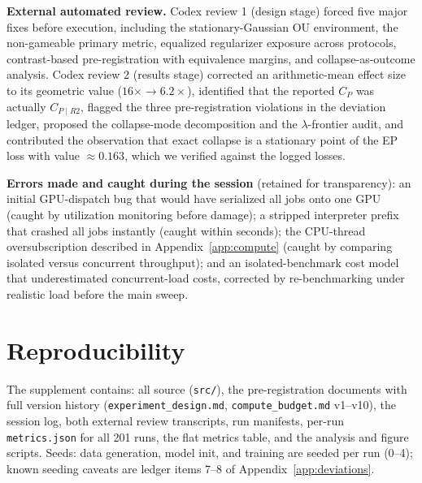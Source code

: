 \textbf{External automated review.} Codex review 1 (design stage) forced five major fixes before execution, including the stationary-Gaussian OU environment, the non-gameable primary metric, equalized regularizer exposure across protocols, contrast-based pre-registration with equivalence margins, and collapse-as-outcome analysis. Codex review 2 (results stage) corrected an arithmetic-mean effect size to its geometric value ($16\times\to6.2\times$), identified that the reported $C_P$ was actually $C_{P\mid R2}$, flagged the three pre-registration violations in the deviation ledger, proposed the collapse-mode decomposition and the $\lambda$-frontier audit, and contributed the observation that exact collapse is a stationary point of the EP loss with value $\approx0.163$, which we verified against the logged losses.

\textbf{Errors made and caught during the session} (retained for transparency): an initial GPU-dispatch bug that would have serialized all jobs onto one GPU (caught by utilization monitoring before damage); a stripped interpreter prefix that crashed all jobs instantly (caught within seconds); the CPU-thread oversubscription described in Appendix~\ref{app:compute} (caught by comparing isolated versus concurrent throughput); and an isolated-benchmark cost model that underestimated concurrent-load costs, corrected by re-benchmarking under realistic load before the main sweep.

\section{Reproducibility}
\label{app:repro}

The supplement contains: all source (\texttt{src/}), the pre-registration documents with full version history (\texttt{experiment\_design.md}, \texttt{compute\_budget.md} v1--v10), the session log, both external review transcripts, run manifests, per-run \texttt{metrics.json} for all 201 runs, the flat metrics table, and the analysis and figure scripts. Seeds: data generation, model init, and training are seeded per run (0--4); known seeding caveats are ledger items 7--8 of Appendix~\ref{app:deviations}.
